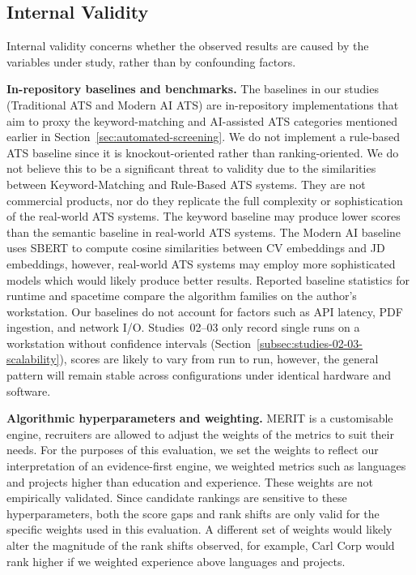 \subsection{Internal Validity}
\label{subsec:internal-validity}

Internal validity concerns whether the observed results are caused by the variables 
under study, rather than by confounding factors.

\textbf{In-repository baselines and benchmarks.}
The baselines in our studies (Traditional ATS and Modern AI ATS) are in-repository implementations that aim to
proxy the keyword-matching and AI-assisted ATS categories mentioned earlier in Section~\ref{sec:automated-screening}.
We do not implement a rule-based ATS baseline since it is knockout-oriented rather than ranking-oriented. 
We do not believe this to be a significant threat to validity due to the similarities between Keyword-Matching and Rule-Based ATS systems.
They are not commercial products, nor do they replicate the full complexity or sophistication of the real-world ATS systems.
The keyword baseline may produce lower scores than the semantic baseline in real-world ATS systems.
The Modern AI baseline uses SBERT to compute cosine similarities between CV embeddings and JD embeddings, however, real-world
ATS systems may employ more sophisticated models which would likely produce better results.
Reported baseline statistics for runtime and spacetime compare the algorithm families on the author's workstation.
Our baselines do not account for factors such as API latency, PDF ingestion, and network I/O.
Studies~02--03 only record single runs on a workstation without confidence intervals (Section~\ref{subsec:studies-02-03-scalability}),
scores are likely to vary from run to run, however, the general pattern will remain stable across configurations under identical hardware and software.

\textbf{Algorithmic hyperparameters and weighting.}
MERIT is a customisable engine, recruiters are allowed to adjust the weights of the metrics to suit their needs.
For the purposes of this evaluation, we set the weights to reflect our interpretation of an evidence-first
engine, we weighted metrics such as languages and projects higher than education and experience.
These weights are not empirically validated. Since candidate rankings are sensitive to these hyperparameters,
both the score gaps and rank shifts are only valid for the specific weights used in this evaluation. A different
set of weights would likely alter the magnitude of the rank shifts observed, for example, Carl Corp would 
rank higher if we weighted experience above languages and projects.

